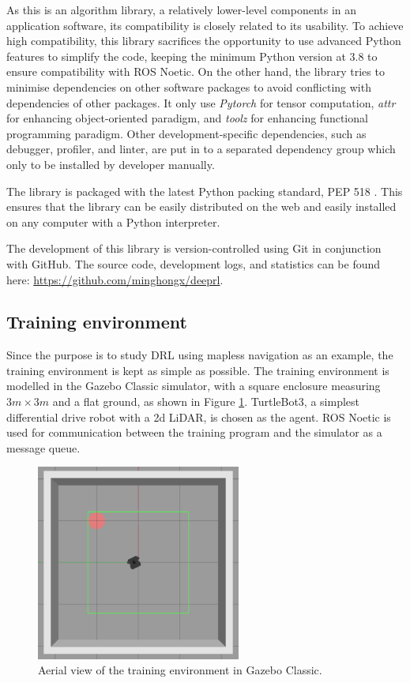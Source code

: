 As this is an algorithm library, a relatively lower-level components in an application software, its compatibility is closely related to its usability. To achieve high compatibility, this library sacrifices the opportunity to use advanced Python features to simplify the code, keeping the minimum Python version at 3.8 to ensure compatibility with ROS Noetic. On the other hand, the library tries to minimise dependencies on other software packages to avoid conflicting with dependencies of other packages. It only use \textit{Pytorch} for tensor computation, \textit{attr} for enhancing object-oriented paradigm, and \textit{toolz} for enhancing functional programming paradigm. Other development-specific dependencies, such as debugger, profiler, and linter, are put in to a separated dependency group which only to be installed by developer manually.

The library is packaged with the latest Python packing standard, PEP 518 \cite{ref:pep518}. This ensures that the library can be easily distributed on the web and easily installed on any computer with a Python interpreter.

The development of this library is version-controlled using Git in conjunction with GitHub. The source code, development logs, and statistics can be found here: \url{https://github.com/minghongx/deeprl}.

\subsection{Training environment}

Since the purpose is to study DRL using mapless navigation as an example, the training environment is kept as simple as possible. The training environment is modelled in the Gazebo Classic simulator, with a square enclosure measuring $3m \times 3m$ and a flat ground, as shown in Figure \ref{fig:birdview}. TurtleBot3, a simplest differential drive robot with a 2d LiDAR, is chosen as the agent. ROS Noetic is used for communication between the training program and the simulator as a message queue.

\begin{figure}[htbp]
   \centering
   \includegraphics[width=0.6\textwidth]{images/birdview-of-env.png}
   \caption{Aerial view of the training environment in Gazebo Classic.}
   \label{fig:birdview}
\end{figure}

